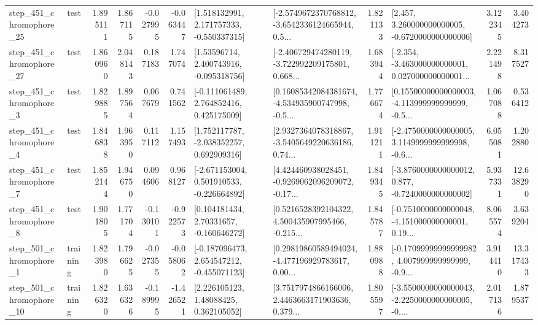 \begin{tabular}{llrrrrllrlrr}
  step\_451\_chromophore\_25 &      test &      1.895111 &    1.867115 &     -0.027995 & -0.063447 &    [1.518132991, 2.171757333, -0.550337315] &  [-2.5749672370768812, -3.6542336124665944, 0.5... &       1.821133 &    [2.457, 3.260000000000005, -0.6720000000000006] &            3.122345 &          3.404273 \\
  step\_451\_chromophore\_27 &      test &      1.860960 &    2.048143 &      0.187183 &  1.747074 &     [1.53596714, 2.400743916, -0.095318756] &  [-2.406729474280119, -3.722992209175801, 0.668... &       1.683944 &  [-2.354, -3.463000000000001, 0.027000000000001... &            2.221498 &          8.317527 \\
   step\_451\_chromophore\_3 &      test &      1.829885 &    1.897564 &      0.067679 &  0.741562 &    [-0.111061489, 2.764852416, 0.425175009] &  [0.16085342084381674, -4.534935900747998, -0.5... &       1.776674 &  [0.15500000000000003, -4.113999999999999, -0.5... &            1.067088 &          0.536412 \\
   step\_451\_chromophore\_4 &      test &      1.846838 &    1.963950 &      0.117112 &  1.157493 &    [1.752117787, -2.038352257, 0.692909316] &  [2.9327364078318867, -3.5405649220636186, 0.74... &       1.911211 &  [-2.4750000000000005, 3.1149999999999998, -0.6... &            6.055081 &          1.202880 \\
   step\_451\_chromophore\_7 &      test &      1.852144 &    1.946750 &      0.094606 &  0.968127 &   [-2.671153004, 0.501910533, -0.226664892] &  [4.424460938028451, -0.9269062096209072, -0.17... &       1.849345 &  [-3.8760000000000012, 0.877, -0.7240000000000002] &            5.937331 &         12.638290 \\
   step\_451\_chromophore\_8 &      test &      1.901805 &    1.771704 &     -0.130101 & -0.922573 &     [0.104181434, 2.70331657, -0.160646272] &  [0.5216528392104322, 4.500435907995466, -0.215... &       1.845787 &  [-0.7510000000000048, -4.151000000000001, 0.19... &            8.065574 &          3.639204 \\
   step\_501\_chromophore\_1 &  training &      1.823980 &    1.796625 &     -0.027355 & -0.058062 &   [-0.187096473, 2.654547212, -0.455071123] &  [0.29819860589494024, -4.477196929783617, 0.00... &       1.880988 &  [-0.17099999999999982, 4.007999999999999, -0.9... &            3.914410 &         13.317433 \\
  step\_501\_chromophore\_10 &  training &      1.826320 &    1.636326 &     -0.189995 & -1.426521 &      [2.226105123, 1.48088425, 0.362105052] &  [3.7517974866166006, 2.4463663171903636, 0.379... &       1.805597 &  [-3.5500000000000043, -2.2250000000000005, -0.... &            2.017136 &          1.879537 \\

\end{tabular}

